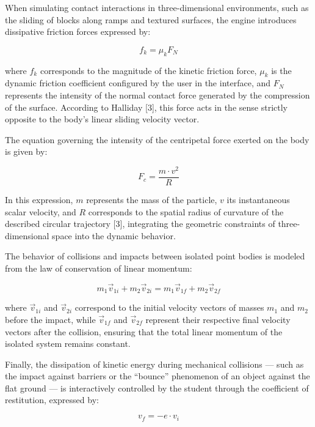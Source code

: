 \documentclass[conference,a4paper]{IEEEtran}
\begin{document}
When simulating contact interactions in three-dimensional environments, such as the sliding of blocks along ramps and textured surfaces, the engine introduces dissipative friction forces expressed by:

\begin{equation}
f_k = \mu_k F_N \tag{21}
\end{equation}

where $f_k$ corresponds to the magnitude of the kinetic friction force, $\mu_k$ is the dynamic friction coefficient configured by the user in the interface, and $F_N$ represents the intensity of the normal contact force generated by the compression of the surface. According to Halliday [3], this force acts in the sense strictly opposite to the body's linear sliding velocity vector.

The equation governing the intensity of the centripetal force exerted on the body is given by:

\begin{equation}
F_c = \frac{m \cdot v^2}{R} \tag{22}
\end{equation}

In this expression, $m$ represents the mass of the particle, $v$ its instantaneous scalar velocity, and $R$ corresponds to the spatial radius of curvature of the described circular trajectory [3], integrating the geometric constraints of three-dimensional space into the dynamic behavior.

The behavior of collisions and impacts between isolated point bodies is modeled from the law of conservation of linear momentum:

\begin{equation}
m_1\vec{v}_{1i} + m_2\vec{v}_{2i} = m_1\vec{v}_{1f} + m_2\vec{v}_{2f} \tag{23}
\end{equation}

where $\vec{v}_{1i}$ and $\vec{v}_{2i}$ correspond to the initial velocity vectors of masses $m_1$ and $m_2$ before the impact, while $\vec{v}_{1f}$ and $\vec{v}_{2f}$ represent their respective final velocity vectors after the collision, ensuring that the total linear momentum of the isolated system remains constant.

Finally, the dissipation of kinetic energy during mechanical collisions --- such as the impact against barriers or the ``bounce'' phenomenon of an object against the flat ground --- is interactively controlled by the student through the coefficient of restitution, expressed by:

\begin{equation}
v_f = -e \cdot v_i \tag{24}
\end{equation}
\end{document}
